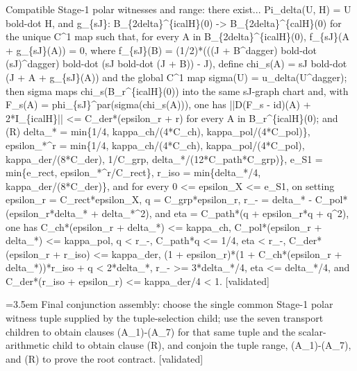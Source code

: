 \documentclass{article}
\newcommand{\step}[1]{\par\noindent\hangindent=3.5em\hangafter=1%
  \makebox[3.5em][l]{\textbf{#1.}}}
\newcommand{\steptag}[1]{\hfill{\small\textsf{[#1]}}}
\begin{document}
\begin{proofbox}{Compatible Stage-1 polar witnesses and range: there exist...}
Pi\_delta(U, H) = U bold-dot H, and g\_\{sJ\}: B\_\{2delta\}\textasciicircum{}\{icalH\}(0) -> B\_\{2delta\}\textasciicircum{}\{calH\}(0) for the unique C\textasciicircum{}1 map such that, for every A in B\_\{2delta\}\textasciicircum{}\{icalH\}(0), f\_\{sJ\}(A + g\_\{sJ\}(A)) = 0, where f\_\{sJ\}(B) = (1/2)*(((J + B\textasciicircum{}dagger) bold-dot (sJ)\textasciicircum{}dagger) bold-dot (sJ bold-dot (J + B)) - J), define chi\_s(A) = sJ bold-dot (J + A + g\_\{sJ\}(A)) and the global C\textasciicircum{}1 map sigma(U) = u\_delta(U\textasciicircum{}dagger); then sigma maps chi\_s(B\_r\textasciicircum{}\{icalH\}(0)) into the same sJ-graph chart and, with F\_s(A) = phi\_\{sJ\}\textasciicircum{}par(sigma(chi\_s(A))), one has ||D(F\_s - id)(A) + 2*I\_\{icalH\}|| <= C\_der*(epsilon\_r + r) for every A in B\_r\textasciicircum{}\{icalH\}(0); and (R) delta\_* = min\{1/4, kappa\_ch/(4*C\_ch), kappa\_pol/(4*C\_pol)\}, epsilon\_*\textasciicircum{}r = min\{1/4, kappa\_ch/(4*C\_ch), kappa\_pol/(4*C\_pol), kappa\_der/(8*C\_der), 1/C\_grp, delta\_*/(12*C\_path*C\_grp)\}, e\_S1 = min\{e\_rect, epsilon\_*\textasciicircum{}r/C\_rect\}, r\_iso = min\{delta\_*/4, kappa\_der/(8*C\_der)\}, and for every 0 <= epsilon\_X <= e\_S1, on setting epsilon\_r = C\_rect*epsilon\_X, q = C\_grp*epsilon\_r, r\_- = delta\_* - C\_pol*(epsilon\_r*delta\_* + delta\_*\textasciicircum{}2), and eta = C\_path*(q + epsilon\_r*q + q\textasciicircum{}2), one has C\_ch*(epsilon\_r + delta\_*) <= kappa\_ch, C\_pol*(epsilon\_r + delta\_*) <= kappa\_pol, q < r\_-, C\_path*q <= 1/4, eta < r\_-, C\_der*(epsilon\_r + r\_iso) <= kappa\_der, (1 + epsilon\_r)*(1 + C\_ch*(epsilon\_r + delta\_*))*r\_iso + q < 2*delta\_*, r\_- >= 3*delta\_*/4, eta <= delta\_*/4, and C\_der*(r\_iso + epsilon\_r) <= kappa\_der/4 < 1. \steptag{validated} \\[6pt]
\step{1.1} Final conjunction assembly: choose the single common Stage-1 polar witness tuple supplied by the tuple-selection child; use the seven transport children to obtain clauses (A\_1)-(A\_7) for that same tuple and the scalar-arithmetic child to obtain clause (R), and conjoin the tuple range, (A\_1)-(A\_7), and (R) to prove the root contract. \steptag{validated} \\[6pt]

\end{proofbox}
\end{document}
